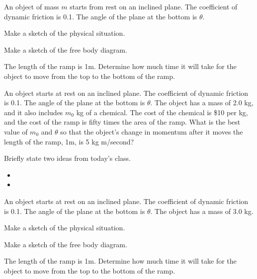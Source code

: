 \begin{problem}
\item An object of mass $m$ starts from rest on an inclined plane. The
  coefficient of dynamic friction is 0.1. The angle of the plane at
  the bottom is $\theta$.
  \begin{subproblem}
  \item Make a sketch of the physical situation.
    \vfill
  \item Make a sketch of the free body diagram.
    \vfill
  \item The length of the ramp is 1m. Determine how much time it will
    take for the object to move from the top to the bottom of the
    ramp.
    \vfill
  \end{subproblem}
\end{problem}



\begin{problem}
\item An object starts at rest on an inclined plane. The coefficient
  of dynamic friction is 0.1. The angle of the plane at the bottom is
  $\theta$. The object has a mass of 2.0 kg, and it also includes
  $m_0$ kg of a chemical. The cost of the chemical is \$10 per kg,
  and the cost of the ramp is fifty times the area of the ramp. What is
  the best value of $m_0$ and $\theta$ so that the object's change in
  momentum after it moves the length of the ramp, 1m, is 5 kg
  m/second?

  \vfill

\end{problem}

\postClass

\begin{problem}
\item Briefly state two ideas from today's class.
  \begin{itemize}
  \item 
  \item 
  \end{itemize}
\item An object starts at rest on an inclined plane. The coefficient
  of dynamic friction is 0.1. The angle of the plane at the bottom is
  $\theta$. The object has a mass of 3.0 kg.
  \begin{subproblem}
  \item Make a sketch of the physical situation.  
    \vfill
  \item Make a sketch of the free body diagram.
    \vfill
    \clearpage
  \item The length of the ramp is 1m. Determine how much time it will
    take for the object to move from the top to the bottom of the
    ramp.  
    \vfill
  \end{subproblem}
\end{problem}


